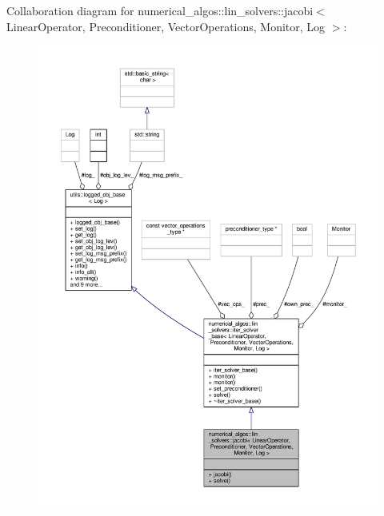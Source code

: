 Collaboration diagram for numerical\-\_\-algos\-:\-:lin\-\_\-solvers\-:\-:jacobi$<$ Linear\-Operator, Preconditioner, Vector\-Operations, Monitor, Log $>$\-:
\nopagebreak
\begin{figure}[H]
\begin{center}
\leavevmode
\includegraphics[width=350pt]{classnumerical__algos_1_1lin__solvers_1_1jacobi__coll__graph}
\end{center}
\end{figure}
